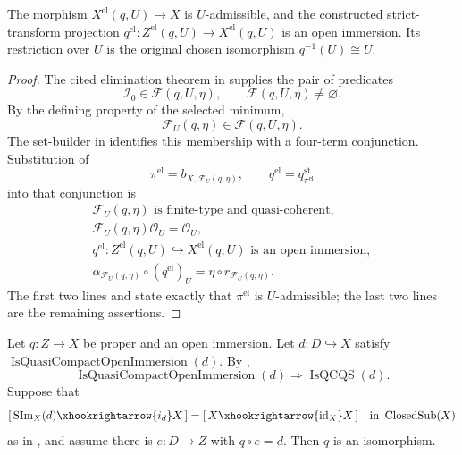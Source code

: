 \begin{lemma}
  \label{lemma:nagata-elimination-indeterminacy}

  The morphism $X^{\mathrm{el}}(q,U)\to X$ is $U$-admissible, and the
  constructed strict-transform projection
  $q^{\mathrm{el}}\colon Z^{\mathrm{el}}(q,U)\to X^{\mathrm{el}}(q,U)$ is
  an open immersion.  Its restriction over $U$ is the original chosen
  isomorphism $q^{-1}(U)\cong U$.
\end{lemma}

\begin{proof}
  The cited elimination theorem in
   supplies the pair of predicates
  \[
    \mathcal I_0\in\mathscr F(q,U,\eta),
    \qquad
    \mathscr F(q,U,\eta)\ne\varnothing.
  \]
  By the defining property of the selected minimum,
  \[
    \mathcal F_U(q,\eta)\in\mathscr F(q,U,\eta).
  \]
  The set-builder in  identifies
  this membership with a four-term conjunction.  Substitution of
  \[
    \pi^{\mathrm{el}}=b_{X,\mathcal F_U(q,\eta)},\qquad
    q^{\mathrm{el}}=q^{\mathrm{st}}_{\pi^{\mathrm{el}}}
  \]
  into that conjunction is
  \[
  \begin{gathered}
    \mathcal F_U(q,\eta)\text{ is finite-type and quasi-coherent},\\
    \mathcal F_U(q,\eta)\mathcal O_U=\mathcal O_U,\\
    q^{\mathrm{el}}\colon Z^{\mathrm{el}}(q,U)
       \hookrightarrow X^{\mathrm{el}}(q,U)
       \text{ is an open immersion},\\
    \alpha_{\mathcal F_U(q,\eta)}\circ(q^{\mathrm{el}})_U
      =\eta\circ r_{\mathcal F_U(q,\eta)}.
  \end{gathered}
  \]
  The first two lines and
   state exactly that
  $\pi^{\mathrm{el}}$ is $U$-admissible; the last two lines are the remaining
  assertions.
\end{proof}

\begin{lemma}
  \label{lemma:nagata-proper-open-dense-iso}

  Let $q\colon Z\to X$ be proper and an open immersion.  Let
  $d\colon D\hookrightarrow X$ satisfy
  $\operatorname{IsQuasiCompactOpenImmersion}(d)$.  By
  ,
  \[
    \operatorname{IsQuasiCompactOpenImmersion}(d)
      \Longrightarrow\operatorname{IsQCQS}(d).                   \tag{PDO0}
  \]
  Suppose that
  \[
    [\,\operatorname{SIm}_X(d)\xhookrightarrow{i_d}X\,]
      =[\,X\xhookrightarrow{\operatorname{id}_X}X\,]
      \quad\text{in }\operatorname{ClosedSub}(X)
  \]
  as in , and assume there is
  $e\colon D\to Z$ with $q\circ e=d$.  Then $q$ is an isomorphism.
\end{lemma}

